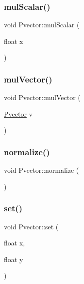 \mbox{\label{class_pvector_aca5515b7c409f641c5565ca0f5bb2940}} 
\subsubsection{\texorpdfstring{mul\+Scalar()}{mulScalar()}}
{\footnotesize\ttfamily void Pvector\+::mul\+Scalar (\begin{DoxyParamCaption}\item[{float}]{x }\end{DoxyParamCaption})}

\mbox{\label{class_pvector_a70d8afa3b3b30c4c0877bdac66ad5e4a}} 
\subsubsection{\texorpdfstring{mul\+Vector()}{mulVector()}}
{\footnotesize\ttfamily void Pvector\+::mul\+Vector (\begin{DoxyParamCaption}\item[{\hyperlink{class_pvector}{Pvector}}]{v }\end{DoxyParamCaption})}

\mbox{\label{class_pvector_af21ee637474eff3c3387a7b7d138004a}} 
\subsubsection{\texorpdfstring{normalize()}{normalize()}}
{\footnotesize\ttfamily void Pvector\+::normalize (\begin{DoxyParamCaption}{ }\end{DoxyParamCaption})}

\mbox{\label{class_pvector_a77eb246570e459227cb4c317af0012b7}} 
\subsubsection{\texorpdfstring{set()}{set()}}
{\footnotesize\ttfamily void Pvector\+::set (\begin{DoxyParamCaption}\item[{float}]{x,  }\item[{float}]{y }\end{DoxyParamCaption})}

